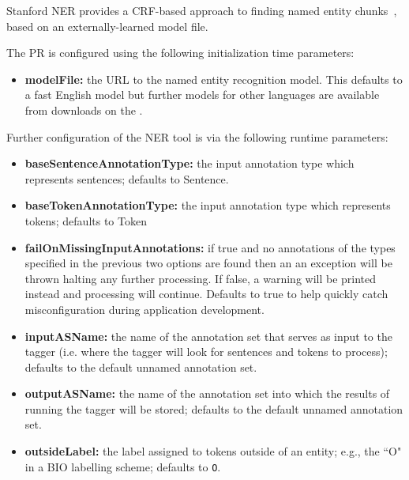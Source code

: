 Stanford NER provides a CRF-based approach to finding named entity chunks~\cite{Finkel2005StanfordNER},
based on an externally-learned model file.


The PR is configured using the following initialization time parameters:

\begin{itemize}
\item \textbf{modelFile:} the URL to the named entity recognition model. This defaults to a
  fast English model but further models for other languages are available from downloads on the
  .
\end{itemize}

Further configuration of the NER tool is via the following runtime parameters:

\begin{itemize}
\item \textbf{baseSentenceAnnotationType:} the input annotation type which
  represents sentences; defaults to Sentence.
\item \textbf{baseTokenAnnotationType:} the input annotation type which
  represents tokens; defaults to Token
\item \textbf{failOnMissingInputAnnotations:} if true and no annotations of
  the types specified in the previous two options are found then an an
  exception will be thrown halting any further processing. If false, a warning
  will be printed instead and processing will continue. Defaults to true to help
  quickly catch misconfiguration during application development.
\item \textbf{inputASName:} the name of the annotation set that serves as input
  to the tagger (i.e. where the tagger will look for sentences and tokens to
  process); defaults to the default unnamed annotation set.
\item \textbf{outputASName:} the name of the annotation set into which the
  results of running the tagger will be stored; defaults to the default unnamed
  annotation set.
\item \textbf{outsideLabel:} the label assigned to tokens outside of an entity;
  e.g., the ``O" in a BIO labelling scheme; defaults to \verb|O|.
\end{itemize}



